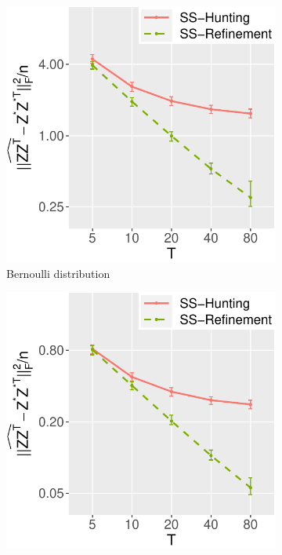 \documentclass[12pt]{article}
\begin{document}
\begin{figure}%
\centering
\begin{subfigure}{0.29\textwidth}
	\centering
	\includegraphics[width=1\linewidth]{Figures/Simu_BC.pdf}
    \caption{Bernoulli distribution}
\end{subfigure}
\begin{subfigure}{0.29\textwidth}
	\centering
	\includegraphics[width=1\linewidth]{Figures/Simu_GC.pdf}

\end{subfigure}
\end{figure}
\end{document}
